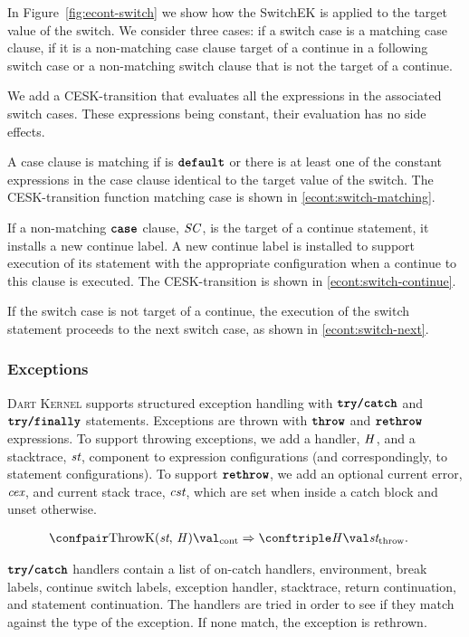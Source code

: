 \documentclass[a4paper,oneside,fleqn]{article}
\newcommand{\kernel}{\textsc{Dart Kernel}}
\newcommand{\synt}[1]{\ensuremath{\text{\textbf{\texttt{#1}}}}}
\DeclareMathOperator{\throw}{\synt{throw}}
\DeclareMathOperator{\rethrow}{\synt{rethrow}}
\DeclareMathOperator{\case}{\synt{case}}
\DeclareMathOperator{\default}{\synt{default}}
\newcommand{\cesktrans}[2]{\ensuremath{{#1} \Rightarrow {#2}}}
\begin{document}
In Figure~\ref{fig:econt-switch} we show how the SwitchEK is applied to the target value of the switch. 
We consider three cases: if a switch case is a matching case clause, if it is a non-matching case clause target of a continue in a following switch case or a non-matching switch clause that is not the target of a continue.

We add a CESK-transition that evaluates all the expressions in the associated switch cases.
These expressions being constant, their evaluation has no side effects.

A case clause is matching if is $\default$ or there is at least one of the constant expressions in the case clause identical to the target value of the switch.
The CESK-transition function  matching case is shown in \eqref{econt:switch-matching}.

If a non-matching $\case$ clause, $\mathit{SC}$, is the target of a continue statement, it installs a new continue label.
A new continue label is installed to support execution of its statement with the appropriate configuration when a continue to this clause is executed.
The CESK-transition is shown in \eqref{econt:switch-continue}.

If the switch case is not target of a continue, the execution of the switch statement proceeds to the next switch case, as shown in \eqref{econt:switch-next}.


\subsubsection{Exceptions}

\kernel{} supports structured exception handling with $\synt{try/catch}$ and $\synt{try/finally}$ statements.
Exceptions are thrown with $\throw$ and $\rethrow$ expressions.
To support throwing exceptions, we add a handler, $\mathit{H}$, and a stacktrace, $\textit{st}$, component to expression configurations (and correspondingly, to statement configurations).
To support $\rethrow$, we add an optional current error, $\textit{cex}$, and current stack trace, $\textit{cst}$, which are set when inside a catch block and unset otherwise.

\begin{align*}
    &\cesktrans%
        {\contconf{\ThrowH{\strace}{\handler}}{\val}}%
        {\throwconf{\handler}{\val}{\strace}}.
\end{align*}

$\synt{try/catch}$ handlers contain a list of on-catch handlers, environment, break labels, continue switch labels, exception handler, stacktrace, return continuation, and statement continuation.
The handlers are tried in order to see if they match against the type of the exception.
If none match, the exception is rethrown.
\end{document}
